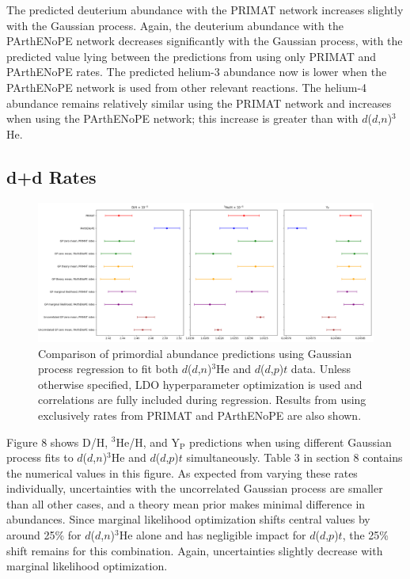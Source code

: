\documentclass[%
 reprint,
superscriptaddress,
nofootinbib,
 amsmath,amssymb,
 aps,
 pra,
]{revtex4-2}
\begin{document}
The predicted deuterium abundance with the PRIMAT network increases slightly with the Gaussian process. Again, the deuterium abundance with the PArthENoPE network decreases significantly with the Gaussian process, with the predicted value lying between the predictions from using only PRIMAT and PArthENoPE rates. The predicted helium-3 abundance now is lower when the PArthENoPE network is used from other relevant reactions. The helium-4 abundance remains relatively similar using the PRIMAT network and increases when using the PArthENoPE network; this increase is greater than with $d$($d$,$n$)$^3$He. 

\subsection{d+d Rates}

\begin{figure}
	\centering
	\includegraphics[width=0.98\linewidth]{Figures/dd_comp.png}
	\caption{Comparison of primordial abundance predictions using Gaussian process regression to fit both $d$($d$,$n$)$^3$He and $d$($d$,$p$)$t$ data. Unless otherwise specified, LDO hyperparameter optimization is used and correlations are fully included during regression. Results from using exclusively rates from PRIMAT and PArthENoPE are also shown.}
\end{figure}

Figure 8 shows D/H, $^3$He/H, and Y$_\text{P}$ predictions when using different Gaussian process fits to $d$($d$,$n$)$^3$He and $d$($d$,$p$)$t$ simultaneously. Table 3 in section 8 contains the numerical values in this figure. As expected from varying these rates individually, uncertainties with the uncorrelated Gaussian process are smaller than all other cases, and a theory mean prior makes minimal difference in abundances. Since marginal likelihood optimization shifts central values by around 25\% for $d$($d$,$n$)$^3$He alone and has negligible impact for $d$($d$,$p$)$t$, the 25\% shift remains for this combination. Again, uncertainties slightly decrease with marginal likelihood optimization.
\end{document}
